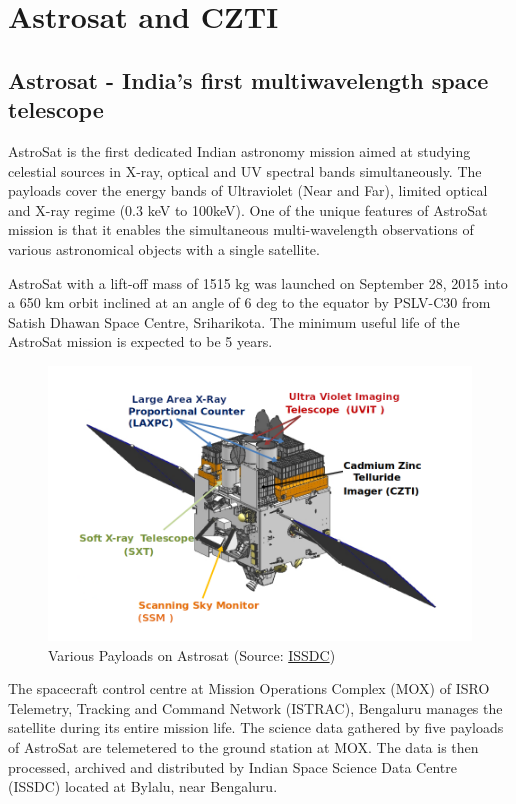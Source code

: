 \documentclass[11pt]{book} %
\begin{document}
\section{Astrosat and CZTI}
\subsection{Astrosat - India's first multiwavelength space telescope}
AstroSat is the first dedicated Indian astronomy mission aimed at studying celestial sources in X-ray, optical and UV spectral bands simultaneously. The payloads cover the energy bands of Ultraviolet (Near and Far), limited optical and X-ray regime (0.3 keV to 100keV). One of the unique features of AstroSat mission is that it enables the simultaneous multi-wavelength observations of various astronomical objects with a single satellite.

AstroSat with a lift-off mass of 1515 kg was launched on September 28, 2015 into a 650 km orbit inclined at an angle of 6 deg to the equator by PSLV-C30 from Satish Dhawan Space Centre, Sriharikota. The minimum useful life of the AstroSat mission is expected to be 5 years.


\begin{figure}
    \centering
    \includegraphics[scale=0.8]{Pictures/astrosat_wireframe.png}
    \caption{Various Payloads on Astrosat (Source: \href{https://webapps.issdc.gov.in/astro_archive/archive/astrosat_images/astrosat_wireframe.png}{ISSDC})}
\end{figure}

The spacecraft control centre at Mission Operations Complex (MOX) of ISRO Telemetry, Tracking and Command Network (ISTRAC), Bengaluru manages the satellite during its entire mission life. The science data gathered by five payloads of AstroSat are telemetered to the ground station at MOX. The data is then processed, archived and distributed by Indian Space Science Data Centre (ISSDC) located at Bylalu, near Bengaluru.
\end{document}
